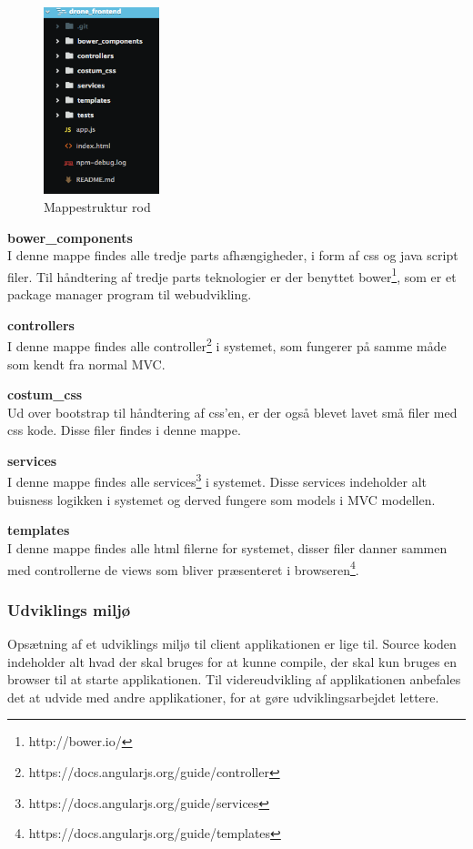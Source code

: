 \begin{figure}[H]
	\centering
	\includegraphics[width=0.3\textwidth]{Billeder/implementation/mappestruktur_client.png}
	\caption{Mappestruktur rod}
	\label{fig:mappestruktur_client}
\end{figure}

\newpage

\textbf{bower\_components}\\
I denne mappe findes alle tredje parts afhængigheder, i form af css og java script filer. Til håndtering af tredje parts teknologier er der benyttet bower\footnote{http://bower.io/}, som er et package manager program til webudvikling.

\textbf{controllers}\\
I denne mappe findes alle controller\footnote{https://docs.angularjs.org/guide/controller} i systemet, som fungerer på samme måde som kendt fra normal MVC.

\textbf{costum\_css}\\
Ud over bootstrap til håndtering af css'en, er der også blevet lavet små filer med css kode. Disse filer findes i denne mappe.

\textbf{services}\\
I denne mappe findes alle services\footnote{https://docs.angularjs.org/guide/services} i systemet. Disse services indeholder alt buisness logikken i systemet og derved fungere som models i MVC modellen.

\textbf{templates}\\
I denne mappe findes alle html filerne for systemet, disser filer danner sammen med controllerne de views som bliver præsenteret i browseren\footnote{https://docs.angularjs.org/guide/templates}.

\subsubsection*{Udviklings miljø}
Opsætning af et udviklings miljø til client applikationen er lige til. Source koden indeholder alt hvad der skal bruges for at kunne compile, der skal kun bruges en browser til at starte applikationen. Til videreudvikling af applikationen anbefales det at udvide med andre applikationer, for at gøre udviklingsarbejdet lettere.

